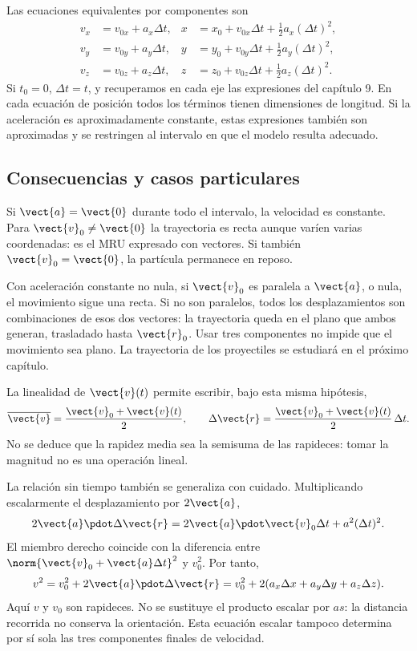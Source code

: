 Las ecuaciones equivalentes por componentes son
\[
\begin{aligned}
v_x&=v_{0x}+a_x\Delta t,&
x&=x_0+v_{0x}\Delta t+\tfrac12a_x(\Delta t)^2,\\
v_y&=v_{0y}+a_y\Delta t,&
y&=y_0+v_{0y}\Delta t+\tfrac12a_y(\Delta t)^2,\\
v_z&=v_{0z}+a_z\Delta t,&
z&=z_0+v_{0z}\Delta t+\tfrac12a_z(\Delta t)^2.
\end{aligned}
\]
Si \(t_0=0\), \(\Delta t=t\), y recuperamos en cada eje las expresiones
del capítulo 9. En cada ecuación de posición todos los términos tienen
dimensiones de longitud. Si la aceleración es aproximadamente constante,
estas expresiones también son aproximadas y se restringen al intervalo
en que el modelo resulta adecuado.

\subsection{Consecuencias y casos particulares}

Si \(\vect{a}=\vect{0}\) durante todo el intervalo, la velocidad es
constante. Para \(\vect{v}_0\ne\vect{0}\) la trayectoria es recta aunque
varíen varias coordenadas: es el MRU expresado con vectores. Si también
\(\vect{v}_0=\vect{0}\), la partícula permanece en reposo.

Con aceleración constante no nula, si \(\vect{v}_0\) es paralela a
\(\vect{a}\), o nula, el movimiento sigue una recta. Si no son paralelos,
todos los desplazamientos son combinaciones de esos dos vectores: la
trayectoria queda en el plano que ambos generan, trasladado hasta
\(\vect{r}_0\). Usar tres componentes no impide que el movimiento sea
plano. La trayectoria de los proyectiles se estudiará en el próximo capítulo.

La linealidad de \(\vect{v}(t)\) permite escribir, bajo esta misma hipótesis,
\[ \overline{\vect{v}}=\frac{\vect{v}_0+\vect{v}(t)}{2},\qquad
\Delta\vect{r}=\frac{\vect{v}_0+\vect{v}(t)}{2}\,\Delta t. \]
No se deduce que la rapidez media sea la semisuma de las rapideces:
tomar la magnitud no es una operación lineal.

La relación sin tiempo también se generaliza con cuidado. Multiplicando
escalarmente el desplazamiento por \(2\vect{a}\),
\[ 2\vect{a}\pdot\Delta\vect{r}
=2\vect{a}\pdot\vect{v}_0\Delta t+a^2(\Delta t)^2. \]
El miembro derecho coincide con la diferencia entre
\(\norm{\vect{v}_0+\vect{a}\Delta t}^2\) y \(v_0^2\). Por tanto,
\[ v^2=v_0^2+2\vect{a}\pdot\Delta\vect{r}
=v_0^2+2(a_x\Delta x+a_y\Delta y+a_z\Delta z). \]
Aquí \(v\) y \(v_0\) son rapideces. No se sustituye el producto escalar
por \(as\): la distancia recorrida no conserva la orientación.
Esta ecuación escalar tampoco determina por sí sola las tres componentes
finales de velocidad.

